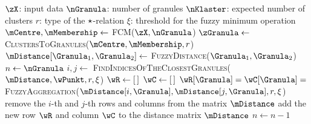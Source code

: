 \documentclass{amcs}
\newcommand{\procedura}[1]{\textsc{#1}}
\newcommand{\MojAlg}{\procedura{GrAgglo}}
\newcommand{\CtoG}{\procedura{ClustersToGranules}}
\newcommand{\FuzzyAggregation}{\procedura{FuzzyAggregation}}
\newcommand{\CALL}[2]{\procedura{#1}(#2)}
\begin{document}
 \begin{algorithm}[!t]
 	\caption{\MojAlg{} -- granular agglomerative hierarchical clustering}
 	\label{alg:MojAlg}
 	\begin{algorithmic}[1]
 		\REQUIRE $\zX$: input data
 		\REQUIRE $\nGranula$: number of granules 
 		\REQUIRE $\nKlaster$: expected number of clusters 
 		\REQUIRE $r$: type of the $\operatorname*{\star}$-relation
 		\REQUIRE $\xi$: threshold for the fuzzy minimum operation
 		\STATE $\mCentre, \mMembership \gets $ \CALL{FCM}{$\zX, \nGranula$} \label{alg:MojAlg:fcm}
 		\STATE $\zGranula \gets $ \CALL{\CtoG}{$\mCentre, \mMembership, r$}  \label{alg:MojAlg:TransFORmToGranules}
 		\label{alg:MojAlg:loop:begin} 
 		\STATE $\mDistance[\Granula_1, \Granula_2] \gets $ \CALL{FuzzyDistance}{$\Granula_1, \Granula_2$} 
 		\ENDFOR
 		\ENDFOR\label{alg:MojAlg:loop:end} 
 		\STATE $n \gets \nGranula$ 
 		\label{alg:MojAlg:WHILE:begin}
 		\STATE $i,j \gets $ \CALL{FindIndicesOfTheClosestGranules}{$\mDistance, \wPunkt, r, \xi$} \label{alg:MojAlg:closest}
 		\STATE $\wR \gets [\,]$ 
 		\STATE $\wC \gets [\,]$  
 		\STATE $\wR[\Granula] = \wC[\Granula] = $ \CALL{\FuzzyAggregation}{$\mDistance[i, \Granula], \mDistance[j, \Granula], r, \xi$} \label{alg:MojAlg:aggregation}
 		\ENDFOR
 		\STATE remove the $i$-th and $j$-th rows and columns from the matrix $\mDistance$ 
 		\STATE add the new row $\wR$ and column $\wC$ to the distance matrix $\mDistance$
 		\STATE $n \gets n - 1$ \label{alg:MojAlg:n}
 		\ENDWHILE\label{alg:MojAlg:WHILE:end}
 	\end{algorithmic}
 \end{algorithm}
 
\end{document}
